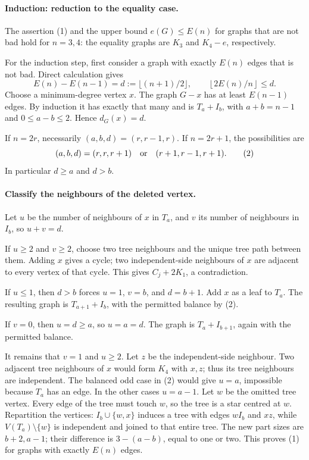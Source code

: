 \paragraph{Induction: reduction to the equality case.}
The assertion (1) and the upper bound \(e(G)\leq E(n)\) for graphs that are not bad hold for \(n=3,4\): the equality graphs are \(K_3\) and \(K_4-e\), respectively.

For the induction step, first consider a graph with exactly \(E(n)\) edges that is not bad. Direct calculation gives
\[
 E(n)-E(n-1)=d:=\lfloor(n+1)/2\rfloor,\qquad
 \left\lfloor 2E(n)/n\right\rfloor\leq d.
\]
Choose a minimum-degree vertex \(x\). The graph \(G-x\) has at least \(E(n-1)\) edges. By induction it has exactly that many and is \(T_a+I_b\), with \(a+b=n-1\) and \(0\leq a-b\leq2\). Hence \(d_G(x)=d\).

If \(n=2r\), necessarily \((a,b,d)=(r,r-1,r)\). If \(n=2r+1\), the possibilities are
\[
 (a,b,d)=(r,r,r+1)\quad\hbox{or}\quad(r+1,r-1,r+1).
\tag{2}
\]
In particular \(d\geq a\) and \(d>b\).

\paragraph{Classify the neighbours of the deleted vertex.}
Let \(u\) be the number of neighbours of \(x\) in \(T_a\), and \(v\) its number of neighbours in \(I_b\), so \(u+v=d\).

If \(u\geq2\) and \(v\geq2\), choose two tree neighbours and the unique tree path between them. Adding \(x\) gives a cycle; two independent-side neighbours of \(x\) are adjacent to every vertex of that cycle. This gives \(C_j+2K_1\), a contradiction.

If \(u\leq1\), then \(d>b\) forces \(u=1\), \(v=b\), and \(d=b+1\). Add \(x\) as a leaf to \(T_a\). The resulting graph is \(T_{a+1}+I_b\), with the permitted balance by (2).

If \(v=0\), then \(u=d\geq a\), so \(u=a=d\). The graph is \(T_a+I_{b+1}\), again with the permitted balance.

It remains that \(v=1\) and \(u\geq2\). Let \(z\) be the independent-side neighbour. Two adjacent tree neighbours of \(x\) would form \(K_4\) with \(x,z\); thus its tree neighbours are independent. The balanced odd case in (2) would give \(u=a\), impossible because \(T_a\) has an edge. In the other cases \(u=a-1\). Let \(w\) be the omitted tree vertex. Every edge of the tree must touch \(w\), so the tree is a star centred at \(w\). Repartition the vertices: \(I_b\cup\{w,x\}\) induces a tree with edges \(wI_b\) and \(xz\), while \(V(T_a)\setminus\{w\}\) is independent and joined to that entire tree. The new part sizes are \(b+2,a-1\); their difference is \(3-(a-b)\), equal to one or two. This proves (1) for graphs with exactly \(E(n)\) edges.

